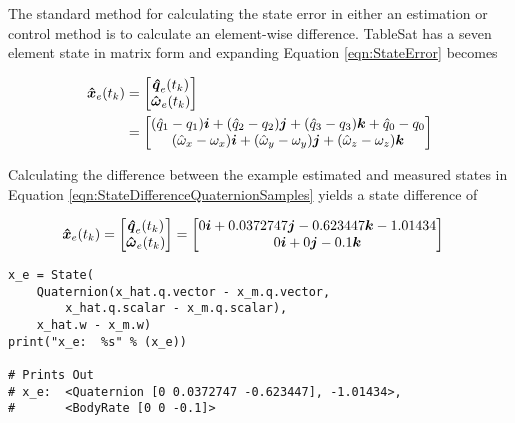 The standard method for calculating the state error in either an estimation or control method is to calculate an element-wise difference.  TableSat has a seven element state in matrix form and expanding Equation \ref{eqn:StateError} becomes

\begin{equation}
  \begin{aligned}
    \boldsymbol{\hat{x}}_e(t_{k}) &= \begin{bmatrix}  \boldsymbol{\hat{q}}_e(t_{k}) \\ \boldsymbol{\hat{\omega}}_e(t_{k}) \\ \end{bmatrix} \\
    &= \begin{bmatrix} (\hat{q}_1 - q_{1}) \boldsymbol{i} + (\hat{q}_2 - q_{2}) \boldsymbol{j} + (\hat{q}_3 - q_{3}) \boldsymbol{k} + \hat{q}_0 - q_{0} \\ (\hat{\omega}_x - \omega_{x}) \boldsymbol{i} + (\hat{\omega}_y - \omega_{y}) \boldsymbol{j} + (\hat{\omega}_z - \omega_{z}) \boldsymbol{k} \end{bmatrix}
  \end{aligned}
  \label{eqn:StateDifference}
\end{equation}


Calculating the difference between the example estimated and measured states in Equation \ref{eqn:StateDifferenceQuaternionSamples} yields a state difference of

\begin{equation}
  \begin{aligned}
    \boldsymbol{\hat{x}}_e(t_{k})
    = \begin{bmatrix}  \boldsymbol{\hat{q}}_e(t_{k}) \\ \boldsymbol{\hat{\omega}}_e(t_{k}) \end{bmatrix}
    &= \begin{bmatrix} 0 \boldsymbol{i} +0.0372747 \boldsymbol{j} -0.623447 \boldsymbol{k} -1.01434 \\ 0 \boldsymbol{i} +0 \boldsymbol{j} -0.1 \boldsymbol{k} \end{bmatrix}
  \end{aligned}
  \label{eqn:StateDifferenceSample}
\end{equation}


\begin{singlespace}
  \begin{verbatim}
x_e = State(
    Quaternion(x_hat.q.vector - x_m.q.vector,
        x_hat.q.scalar - x_m.q.scalar),
    x_hat.w - x_m.w)
print("x_e:  %s" % (x_e))

# Prints Out
# x_e:  <Quaternion [0 0.0372747 -0.623447], -1.01434>,
#       <BodyRate [0 0 -0.1]>
  \end{verbatim}
\nocite{minted}
\end{singlespace}


